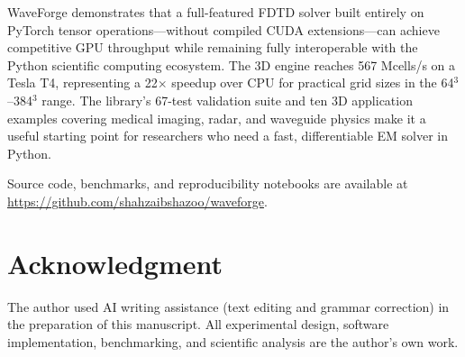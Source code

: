 \documentclass[10pt,twocolumn]{article}
\begin{document}
WaveForge demonstrates that a full-featured FDTD solver built entirely on
PyTorch tensor operations—without compiled CUDA extensions—can achieve
competitive GPU throughput while remaining fully interoperable with the
Python scientific computing ecosystem. The 3D engine reaches 567 Mcells/s
on a Tesla T4, representing a 22$\times$ speedup over CPU for practical
grid sizes in the 64$^3$--384$^3$ range. The library's 67-test validation
suite and ten 3D application examples covering medical imaging, radar, and
waveguide physics make it a useful starting point for researchers who need
a fast, differentiable EM solver in Python.

Source code, benchmarks, and reproducibility notebooks are available at
\url{https://github.com/shahzaibshazoo/waveforge}.

\section*{Acknowledgment}

The author used AI writing assistance (text editing and grammar correction)
in the preparation of this manuscript. All experimental design, software
implementation, benchmarking, and scientific analysis are the author's own work.



\end{document}
